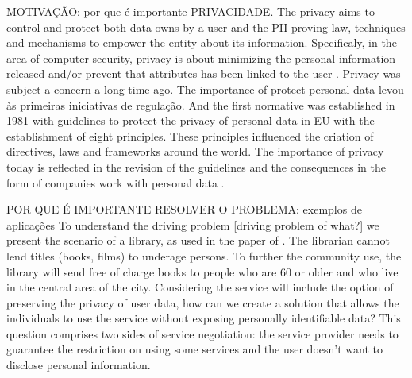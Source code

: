 \documentclass{doublecol-new}
\begin{document}
MOTIVAÇÃO: por que é importante PRIVACIDADE.
The privacy aims to control and protect both data owns by a user and the PII proving law, techniques and mechanisms to empower the entity about its information. Specificaly, in the area of computer security, privacy is about minimizing the personal information released and/or prevent that attributes has been linked to the user \citep{gurses2011engineering,heurix2015taxonomy,landwehr2012privacy}. Privacy was subject a concern a long time ago. The importance of protect personal data levou às primeiras iniciativas de regulação. And the first normative was established in 1981 with guidelines to protect the privacy of personal data in EU \citep{oecd1981guidelines} with the establishment of eight principles. These principles influenced the criation of directives, laws and frameworks around the world. The importance of privacy today is reflected in the revision of the guidelines \citep{oecd2013guidelinesupdated} and the consequences in the form of companies work with personal data \citep{kuschewsky2014new}. 

POR QUE É IMPORTANTE RESOLVER O PROBLEMA: exemplos de aplicações
To understand the driving problem [driving problem of what?] we present the scenario of a library, as used in the paper of \citep{camenisch2014concepts}. The librarian cannot lend titles (books, films) to underage persons. To further the community use, the library will send free of charge books to people who are 60 or older and who live in the central area of the city. Considering the service will include the option of preserving the privacy of user data, how can we create a solution that allows the individuals to use the service without exposing personally identifiable data? This question comprises two sides of service negotiation: the service provider needs to guarantee the restriction on using some services and the user doesn't want to disclose personal information.
\end{document}
